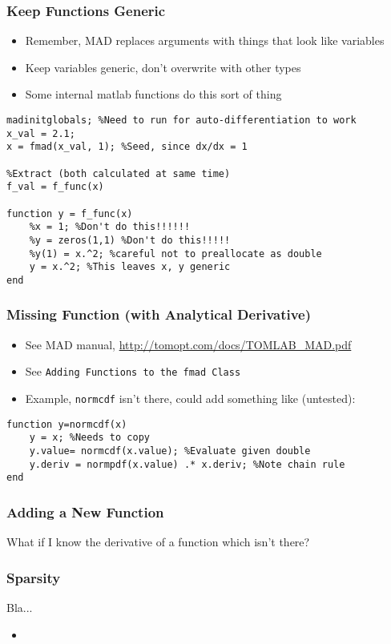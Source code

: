 \documentclass[nofootline]{etk-presentation}
\begin{document}
\begin{frame}[fragile]	\frametitle{Keep Functions Generic}
	\begin{itemize}
		\item Remember, MAD replaces arguments with things that look like variables
		\item Keep variables generic, don't overwrite with other types
		\item Some internal matlab functions do this sort of thing
	\end{itemize}

\begin{verbatim}
madinitglobals; %Need to run for auto-differentiation to work
x_val = 2.1;
x = fmad(x_val, 1); %Seed, since dx/dx = 1

%Extract (both calculated at same time)
f_val = f_func(x)

function y = f_func(x)
	%x = 1; %Don't do this!!!!!!
	%y = zeros(1,1) %Don't do this!!!!!
	%y(1) = x.^2; %careful not to preallocate as double
	y = x.^2; %This leaves x, y generic
end
\end{verbatim}	

 \end{frame}

\begin{frame}[fragile]	\frametitle{Missing Function (with Analytical Derivative)}
\begin{itemize}
	\item See MAD manual, \url{http://tomopt.com/docs/TOMLAB_MAD.pdf}
	\item See \verb!Adding Functions to the fmad Class!
	\item Example, \verb!normcdf! isn't there, could add something like (untested):
\end{itemize}

\begin{verbatim}
function y=normcdf(x)
	y = x; %Needs to copy		
	y.value= normcdf(x.value); %Evaluate given double 
	y.deriv = normpdf(x.value) .* x.deriv; %Note chain rule
end
\end{verbatim}
 \end{frame}


\begin{frame}	\frametitle{Adding a New Function}
	What if I know the derivative of a function which isn't there?
\end{frame}


\begin{frame}	\frametitle{Sparsity}
Bla...
	\begin{itemize}
		\item 
	\end{itemize}
\end{frame}
\end{document}
